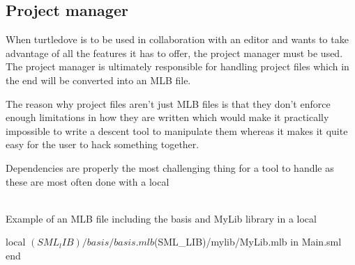 \subsection{Project manager}

When turtledove is to be used in collaboration with an editor and wants to take
advantage of all the features it has to offer, the project manager must be
used. The project manager is ultimately responsible for handling project files
which in the end will be converted into an MLB file.

The reason why project files aren't just MLB files is that they don't enforce
enough limitations in how they are written which would make it practically
impossible to write a descent tool to manipulate them whereas it makes it quite
easy for the user to hack something together.

Dependencies are properly the most challenging thing for a tool to handle as
these are most often done with a local

\begin{example}\ \\
Example of an MLB file including the basis and MyLib library in a local
  \begin{sml}
local
  $(SML_lIB)/basis/basis.mlb
  $(SML_LIB)/mylib/MyLib.mlb
in
Main.sml
end      
  \end{sml}
\end{example}


